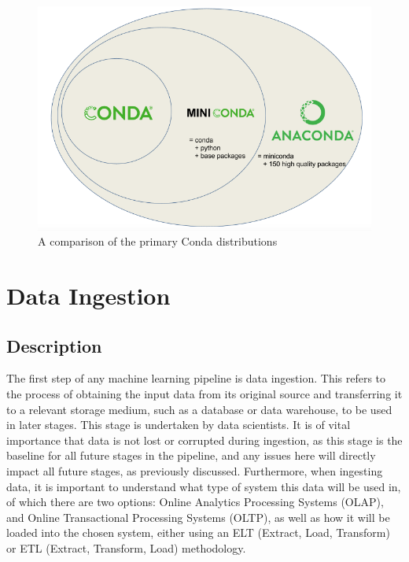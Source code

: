 \documentclass[12pt]{report}
\begin{document}
\begin{figure}[H]
    \centering
    \includegraphics[width=.75\linewidth]{miniconda.png}
    \caption{A comparison of the primary Conda distributions \autocite{towardsdatascience_getting_2021}}
    \label{fig:Miniconda}
\end{figure}

\pagebreak

\section{Data Ingestion}\label{sec:Ingestion}
\subsection{Description}
The first step of any machine learning pipeline is data ingestion. This refers to the process of obtaining the input data from its original source
and transferring it to a relevant storage medium, such as a database or data warehouse, to be used in later stages. This stage 
is undertaken by data scientists. 
It is of vital importance that data is not lost or corrupted during ingestion, as this stage is the baseline for all future stages in the pipeline, and any issues
here will directly impact all future stages, as previously discussed. Furthermore, when ingesting data, it is important to understand what type of system this data 
will be used in, of which there are two options: Online Analytics Processing Systems (OLAP), and Online Transactional Processing Systems (OLTP), as well 
as how it will be loaded into the chosen system, either using an ELT (Extract, Load, Transform) or ETL (Extract, Transform, Load) methodology.
\end{document}
